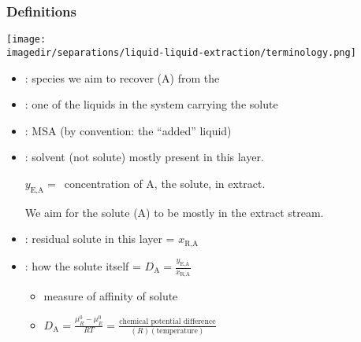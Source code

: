 \begin{frame}\frametitle{Definitions}
	\begin{center}
		\texttt{[image: \\imagedir/separations/liquid-liquid-extraction/terminology.png]}
	\end{center}

	\begin{itemize}
		\item	{\color{purple}{solute}}: species we aim to recover (A) from the {\color{purple}{feed}}
		\item	{\color{purple}{``carrier'' or ``feed solvent''}}: one of the liquids in the system carrying the solute
		\item	{\color{purple}{solvent}}: MSA (by convention: the ``added'' liquid)
		\item	{\color{purple}{extract}}: solvent (not solute) mostly present in this layer.

				$y_\text{E,A} =$~concentration of A, the solute, in extract.

				We aim for the solute (A) to be mostly in the extract stream.


		\item	{\color{purple}{raffinate}}: residual solute in this layer = $x_\text{R,A}$
		\item	{\color{purple}{distribution}}: how the solute {\color{purple}{partitions}} itself = $D_\text{A} = \displaystyle \frac{y_\text{E,A}}{x_\text{R,A}}$
			\begin{itemize}
				\item	measure of affinity of solute
				\item	$D_\text{A} = \displaystyle \frac{\mu_R^0 - \mu_E^0}{RT} = \displaystyle \frac{\text{chemical potential difference}}{(R)(\text{temperature})}$	%
			\end{itemize}
	\end{itemize}
\end{frame}

